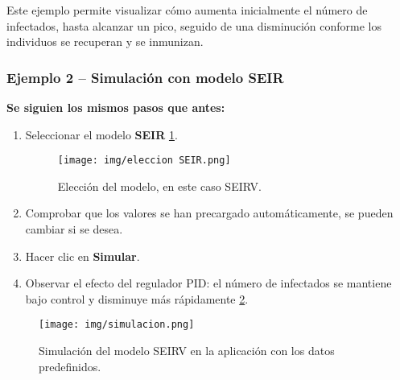Este ejemplo permite visualizar cómo aumenta inicialmente el número de infectados, hasta alcanzar un pico, seguido de una disminución conforme los individuos se recuperan y se inmunizan.

\vspace{1em}
\subsubsection{Ejemplo 2 – Simulación con modelo SEIR}

\textbf{Se siguien los mismos pasos que antes:}
\begin{enumerate}
    \item Seleccionar el modelo \textbf{SEIR} \ref{fig:eleccion seirv}.

    \begin{figure}[H]
        \centering
        \texttt{[image: img/eleccion SEIR.png]}
        \caption{Elección del modelo, en este caso SEIRV.}
        \label{fig:eleccion seirv}
        
    \end{figure}
    \item Comprobar que los valores se han precargado automáticamente, se pueden cambiar si se desea.
    \item Hacer clic en \textbf{Simular}.
    \item Observar el efecto del regulador PID: el número de infectados se mantiene bajo control y disminuye más rápidamente \ref{fig:eseeir}.
\end{enumerate}




\begin{figure}[H]
        \centering
        \texttt{[image: img/simulacion.png]}
        \caption{Simulación del modelo SEIRV en la aplicación con los datos predefinidos.}
        \label{fig:eseeir}
       
    \end{figure}









